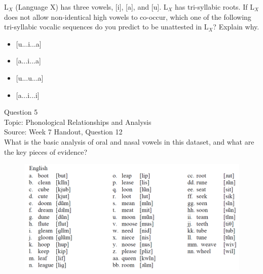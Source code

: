 \documentclass[12pt]{article}
\begin{document}
L$_X$ (Language X) has three vowels, [i], [a], and [u]. L$_X$ has tri-syllabic roots. If L$_X$ does not allow non-identical high vowels to co-occur, which one of the following tri-syllabic vocalic sequences do you predict to be unattested in L$_X$? Explain why.\\

\begin{itemize} \item {[u...i...a]} \item {[a...i...a]} \item {[u...u...a]} \item {[a...i...i]} \end{itemize}


\newpage

{\large Question 5}\\

Topic: Phonological Relationships and Analysis\\
Source: Week 7 Handout, Question 12\\

What is the basic analysis of oral and nasal vowels in this dataset, and what are the key pieces of evidence?\\

\begin{figure}[H]
\includegraphics{../images/english12.png}
\end{figure}

\newpage

\begin{center}
\textbf{{\color{red}{\HUGE END OF EXAM}}}\\

\end{center}
\newpage

\begin{center}
\textbf{{\color{blue}{\HUGE START OF EXAM\\}}}

\textbf{{\color{blue}{\HUGE Student ID: 17357\\}}}

\textbf{{\color{blue}{\HUGE \\}}}

\end{center}
\newpage
\end{document}
